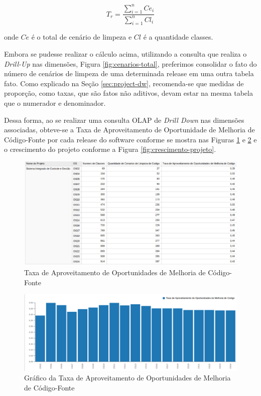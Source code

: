 \begin{equation}
\label{eqn01}
T_r =   \frac{{\sum_{i=1}^{n}{Ce_i}}}{\sum_{i=1}^{n}{Cl_i}}
\end{equation}

onde $ Ce $ é o total de cenário de limpeza e $ Cl $ é a quantidade classes.

 Embora se pudesse realizar o cálculo acima, utilizando a consulta que realiza o \textit{Drill-Up} nas dimensões, Figura \ref{fig:cenarios-total}, preferimos consolidar o fato do número de cenários de limpeza de uma determinada release em uma outra tabela fato. Como explicado na Seção \ref{sec:project-dw},  recomenda-se que medidas de proporção, como taxas, que são fatos não aditivos, devam estar na mesma tabela que o numerador e denominador.

 Dessa forma, ao se realizar uma consulta OLAP de \textit{Drill Down} nas dimensões associadas, obteve-se a Taxa de Aproveitamento de Oportunidade de Melhoria de Código-Fonte por cada release do software conforme se mostra nas Figuras \ref{fig:taxa-cenarios} e \ref{fig:grafico-taxa} e o crescimento do projeto conforme a Figura \ref{fig:crescimento-projeto}. 


\begin{figure}[H]
\centering
\includegraphics[keepaspectratio=true,scale=0.48]{figuras/taxa-parcial.eps}
\caption{Taxa de Aproveitamento de Oportunidades de Melhoria de Código-Fonte}
\label{fig:taxa-cenarios}
\end{figure}
\FloatBarrier


\begin{figure}[H]
\centering
\includegraphics[keepaspectratio=false,scale=0.48]{figuras/taxa-grafico.eps}
\caption{Gráfico da Taxa de Aproveitamento de Oportunidades de Melhoria de Código-Fonte}
\label{fig:grafico-taxa}
\end{figure}
\FloatBarrier

